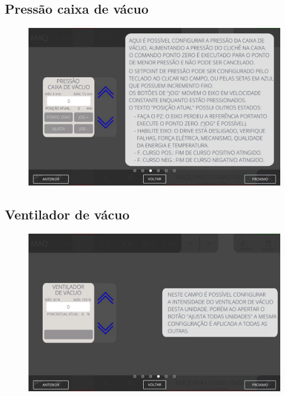 \newpage
\thispagestyle{fancy}
\vspace*{\fill}
\subsection{Pressão caixa de vácuo}
\vspace*{\fill}
\begin{figure}[h]
    \centering
    \includegraphics[width=576 px,height=360 px]{src/imagesICV/04-printters/02-printter/settings/e-3.png}
\end{figure}
\vspace*{\fill}

\newpage
\thispagestyle{fancy}
\vspace*{\fill}
\subsection{Ventilador de vácuo}
\vspace*{\fill}
\begin{figure}[h]
    \centering
    \includegraphics[width=576 px,height=360 px]{src/imagesICV/04-printters/02-printter/settings/e-4.png}
\end{figure}
\vspace*{\fill}

